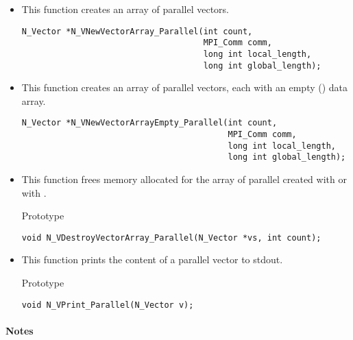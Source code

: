 \begin{itemize}

\item {}
 
  This function creates an array of  parallel vectors.
 
\begin{verbatim}
N_Vector *N_VNewVectorArray_Parallel(int count, 
                                     MPI_Comm comm, 
                                     long int local_length,
                                     long int global_length);
\end{verbatim}


\item {}
 
  This function creates an array of  parallel vectors,
  each with an empty () data array.
 
\begin{verbatim}
N_Vector *N_VNewVectorArrayEmpty_Parallel(int count, 
                                          MPI_Comm comm, 
                                          long int local_length,
                                          long int global_length);
\end{verbatim}


\item {}
 
 This function frees memory allocated for the array of  parallel  
 created with  or with .

 Prototype

 \verb|void N_VDestroyVectorArray_Parallel(N_Vector *vs, int count);|



\item {}
  
  This function prints the content of a parallel vector to stdout.
 
  Prototype
  
  \verb|void N_VPrint_Parallel(N_Vector v);|


\end{itemize}
\paragraph{\bf Notes} 
           
